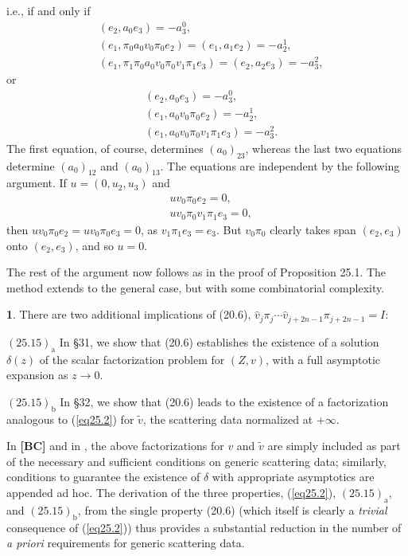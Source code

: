 \documentclass{surv-l}
\theoremstyle{plain}
\theoremstyle{definition}
\newtheorem{remark}[theorem]{\sc{Remark}}
\numberwithin{equation}{chapter}
\begin{document}
i.e., if and only if
\begin{align*}
&(e_{2},a_{0}e_{3}) =-a_{3}^{0},\\
& (e_{1}, \pi_{0}a_{0}v_{0}\pi_{0}e_{2})=(e_{1}, a_{1}e_{2})=-a_{2}^{1},\\
&(e_{1}, \pi_{1}\pi_{0}a_{0}v_{0}\pi_{0}v_{1}\pi_{1}e_{3})=(e_{2},a_{2}e_{3})=-a_{3}^{2},
\end{align*}
or
\begin{align*}
&(e_{2}, a_{0}e_{3})=-a_{3}^{0},\\
&(e_{1}, a_{0}v_{0}\pi_{0}e_{2})=-a_{2}^{1},\\
&(e_{1}, a_{0}v_{0}\pi_{0}v_{1}\pi_{1}e_{3})=-a_{3}^{2}.
\end{align*}
The first equation, of course, determines $(a_{0})_{23}$, whereas the last two equations determine $(a_{0})_{12}$ and $(a_{0})_{13}$. The equations are independent by the following argument. If $u=(0,u_{2},u_{3})$ and
\begin{align*}
&uv_{0}\pi_{0}e_{2}=0,\\
&uv_{0}\pi_{0}v_{1}\pi_{1}e_{3}=0,
\end{align*}
then $uv_{0}\pi_{0}e_{2}=uv_{0}\pi_{0}e_{3}=0$, as $v_{1}\pi_{1}e_{3}=e_{3}$. But $v_{0}\pi_{0}$ clearly takes span $(e_{2},e_{3})$ onto $(e_{2}, e_{3})$, and so $u=0$.

The rest of the argument now follows as in the proof of Proposition 25.1. The method extends to the general case, but with some combinatorial complexity.

\begin{remark}\label{rem25.15}
There are two additional implications of (20.6), $\hat{v}_{j}\pi_{j}\cdots\hat{v}_{j+2n-1}\pi_{j+2n-1}=I$:
\end{remark}

$(25.15)_{\mathrm{a}}$ In \S31, we show that (20.6) establishes the existence of a solution $\delta(z)$ of the scalar factorization problem for $(Z, v)$, with a full asymptotic expansion as $z\rightarrow 0$.

$(25.15)_{\mathrm{b}}$ In \S 32, we show that (20.6) leads to the existence of a factorization analogous to (\ref{eq25.2}) for $\tilde{v}$, the scattering data normalized at $+\infty$.

In \textbf{[BC]} and in \cite{Be}, the above factorizations for $v$ and $\tilde{v}$ are simply included as part of the necessary and sufficient conditions on generic scattering data; similarly, conditions to guarantee the existence of $\delta$ with appropriate asymptotics are appended ad hoc. The derivation of the three properties, (\ref{eq25.2}), $\mathrm{(25.15)_{a}}$, and $\mathrm{(25.15)_{b}}$, from the single property (20.6) (which itself is clearly a \emph{trivial} consequence of (\ref{eq25.2})) thus provides a substantial reduction in the number of \emph{a priori} requirements for generic scattering data.
\end{document}
